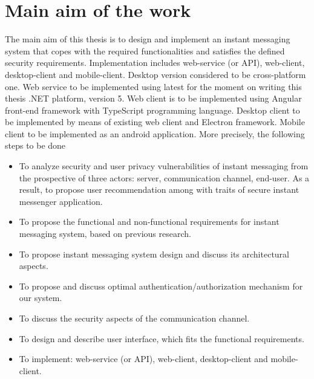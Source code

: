 \chapter{Main aim of the work}\label{ch:main-aim-of-the-work}

The main aim of this thesis is to design and implement an instant messaging system
that copes with the required functionalities and satisfies the defined security requirements.
Implementation includes web-service (or API), web-client, desktop-client and mobile-client.
Desktop version considered to be cross-platform one.
Web service to be implemented using latest for the moment on writing this thesis .NET platform, version 5.
Web client is to be implemented using Angular front-end framework with TypeScript programming language.
Desktop client to be implemented by means of existing web client and Electron framework.
Mobile client to be implemented as an android application.
More precisely, the following steps to be done
\begin{itemize}
    \item To analyze security and user privacy vulnerabilities of instant messaging from the prospective of three
    actors: server, communication channel, end-user.
    As a result, to propose user recommendation among with traits of secure instant messenger application.
    \item To propose the functional and non-functional requirements for instant messaging system, based on previous
    research.
    \item To propose instant messaging system design and discuss its architectural aspects.
    \item To propose and discuss optimal authentication/authorization mechanism for our system.
    \item To discuss the security aspects of the communication channel.
    \item To design and describe user interface, which fits the functional requirements.
    \item To implement: web-service (or API), web-client, desktop-client and mobile-client.
\end{itemize}